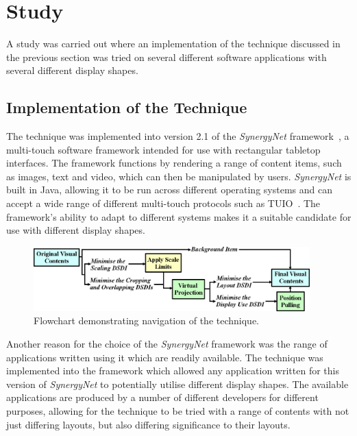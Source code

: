 \documentclass[twocolumn,compsoc]{cvm}
\begin{document}
\section{Study}
\label{sec:study}

A study was carried out where an implementation of the technique discussed  in the previous section was tried on several different software applications with several different display shapes.

\subsection{Implementation of the Technique}
\label{subsec:implementation} 

The technique was implemented into version 2.1 of the {\emph{SynergyNet}} framework~\cite{McNaughton2017,AlAgha2010}, a multi-touch software framework intended for use with rectangular tabletop interfaces.
The framework functions by rendering a range of content items, such as images, text and video, which can then be manipulated by users.
{\emph{SynergyNet}} is built in Java, allowing it to be run across different operating systems and can accept a wide range of different multi-touch protocols such as TUIO~\cite{Kaltenbrunner2007}.
The framework's ability to adapt to different systems makes it a suitable candidate for use with different display shapes.

\begin{figure}[h!] 
 \centering
   \includegraphics[width=0.95\textwidth]{figures/TechniqueFlowchart.jpeg}
   \caption{Flowchart demonstrating navigation of the technique.}
   \label{fig:flowchart}
\end{figure}

Another reason for the choice of the {\emph{SynergyNet}} framework was the range of applications written using it which are readily available.
The technique was implemented into the framework which allowed any application written for this version of {\emph{SynergyNet}} to potentially utilise different display shapes.
The available applications are produced by a number of different developers for different purposes, allowing for the technique to be tried with a range of contents with not just differing layouts, but also differing significance to their layouts.
\end{document}
